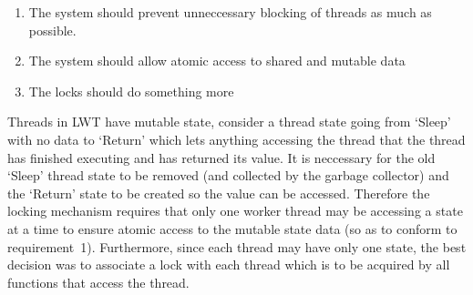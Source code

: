 \documentclass[12pt,twoside,notitlepage]{report}
\begin{document}
\begin{enumerate}
\item The system should prevent unneccessary blocking of threads as much as possible.
\item The system should allow atomic access to shared and mutable data
\item The locks should do something more
\end{enumerate}
%
%
Threads in LWT have mutable state, consider a thread state going from `Sleep' with no data to `Return' which lets anything accessing the thread that the thread has finished executing and has returned its value. It is neccessary for
the old `Sleep' thread state to be removed (and collected by the garbage collector) and the `Return' state to be created so the value can be accessed. Therefore the locking mechanism requires that only one worker thread may be
accessing a state at a time to ensure atomic access to the mutable state data (so as to conform to requirement~1). Furthermore, since each thread may have only one state, the best decision was to associate a lock with each thread
which is to be acquired by all functions that access the thread. 

%
%
\end{document}
